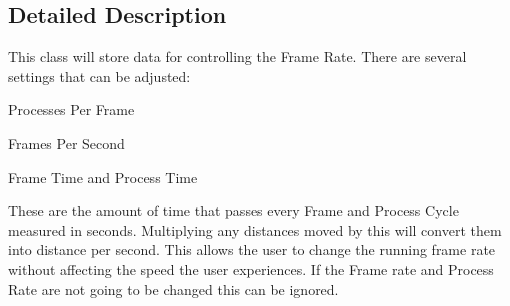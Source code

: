 \subsection{Detailed Description}
This class will store data for controlling the Frame Rate. There are several settings that can be adjusted: 


\begin{DoxyItemize}
\item Processes Per Frame
\item Frames Per Second
\item Frame Time and Process Time
\end{DoxyItemize}These are the amount of time that passes every Frame and Process Cycle measured in seconds. Multiplying any distances moved by this will convert them into distance per second. This allows the user to change the running frame rate without affecting the speed the user experiences. If the Frame rate and Process Rate are not going to be changed this can be ignored. 